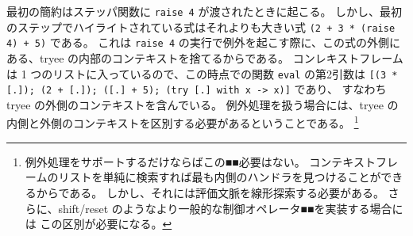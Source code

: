 \noindent 最初の簡約はステッパ関数に \texttt{raise 4} が渡されたときに起こる。
しかし、最初のステップでハイライトされている式はそれよりも大きい式
\texttt{(2 + 3 * (raise 4) + 5)} である。
これは \texttt{raise 4} の実行で例外を起こす際に、この式の外側にある、tryee の内部のコンテキストを捨てるからである。
コンレキストフレームは 1 つのリストに入っているので、この時点での関数 \texttt{eval} の第2引数は
\texttt{[(3 * [.]); (2 + [.]);\ ([.]\ + 5);\ (try [.]\ with x -> x)]} であり、
すなわち tryee の外側のコンテキストを含んでいる。
例外処理を扱う場合には、tryee の内側と外側のコンテキストを区別する必要があるということである。
\footnote{
例外処理をサポートするだけならばこの■■必要はない。
コンテキストフレームのリストを単純に検索すれば最も内側のハンドラを見つけることができるからである。
しかし、それには評価文脈を線形探索する必要がある。
さらに、shift/reset のようなより一般的な制御オペレータ■■を実装する場合には
この区別が必要になる。
}

